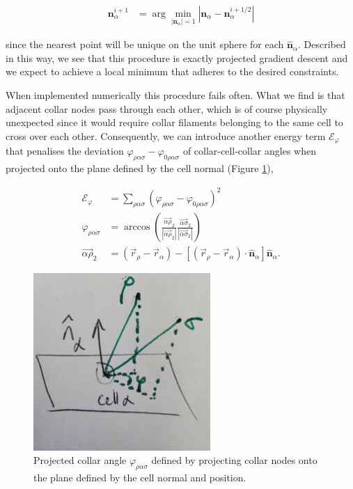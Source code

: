 \documentclass[draft]{article}
\newcommand{\e}{\mathcal{E}}
\newcommand{\bh}[1]{\hat{\bm{#1}}}
\begin{document}
\begin{align*}
	\bm{n}_\alpha^{i+1} &= \arg\min_{\left| \bm{n}_\alpha \right| = 1} \left| \bm{n}_\alpha - \bm{n}_\alpha^{i+1/2} \right| 
\end{align*}

\noindent since the nearest point will be unique on the unit sphere for each $\bh{n}_\alpha$. Described in this way, we see that this procedure is exactly projected gradient descent and we expect to achieve a local minimum that adheres to the desired constraints. 

When implemented numerically this procedure fails often. What we find is that adjacent collar nodes pass through each other, which is of course physically unexpected since it would require collar filaments belonging to the same cell to cross over each other. Consequently, we can introduce another energy term $\e_\varphi$ that penalises the deviation $\varphi_{\rho\alpha\sigma} - \varphi_{0\rho\alpha\sigma}$ of collar-cell-collar angles when projected onto the plane defined by the cell normal (Figure \ref{fig:proj_varphi}),

\begin{align*}
	\e_\varphi &= \sum_{\rho\alpha\sigma} \left(\varphi_{\rho\alpha\sigma} - \varphi_{0\rho\alpha\sigma} \right)^2 \\
	\varphi_{\rho\alpha\sigma} &= \arccos \left(\frac{\vec{\alpha\rho}_2}{\left|\vec{\alpha\rho}_2\right|} \frac{\vec{\alpha\sigma}_2}{\left|\vec{\alpha\sigma}_2\right|}\right) \\
	\vec{\alpha\rho}_2 &= \left(\vec{r}_\rho - \vec{r}_\alpha \right) - \left[\left(\vec{r}_\rho - \vec{r}_\alpha \right)\cdot \bh{n}_\alpha \right] \bh{n}_\alpha.
\end{align*}

\begin{figure}
	\centering
	\includegraphics[width=0.6\textwidth]{figures/proj_varphi.jpg}
	\caption{Projected collar angle $\varphi_{\rho\alpha\sigma}$ defined by projecting collar nodes onto the plane defined by the cell normal and position.}
	\label{fig:proj_varphi}
\end{figure}
\end{document}

